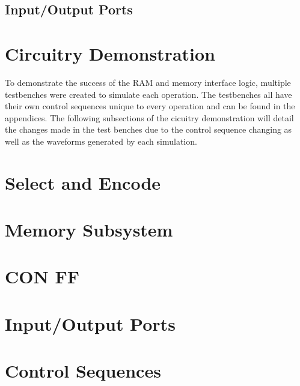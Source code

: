 \documentclass{article}
\begin{document}
    \subsection{Input/Output Ports}
    
\section{Circuitry Demonstration}
    To demonstrate the success of the RAM and memory interface logic, multiple testbenches were created to simulate each operation. 
    The testbenches all have their own control sequences unique to every operation and can be found in the appendices. The following subsections 
    of the cicuitry demonstration will detail the changes made in the test benches due to the control sequence changing as well as the waveforms generated by each simulation.

\appendix
\section{Select and Encode}
\section{Memory Subsystem}
\section{CON FF}
\section{Input/Output Ports}
\section{Control Sequences}
\end{document}
